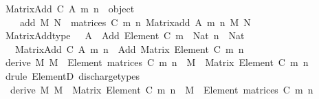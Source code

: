 \begin{isabellebody}
\ {\isachardoublequoteopen}Matrix{\isacharunderscore}{\kern0pt}Add\ C\ A\ m\ n\ {\isasymequiv}\ object\ {\isacharbraceleft}{\kern0pt}\isanewline
\ \ \ \ {\isasymlangle}{\isacharat}{\kern0pt}add{\isacharcomma}{\kern0pt}\ {\isasymlambda}M\ N\ {\isasymin}\ matrices\ C\ m\ n{\isachardot}{\kern0pt}\ Matrix{\isacharunderscore}{\kern0pt}add\ A\ m\ n\ M\ N{\isasymrangle}\isanewline
\ \ {\isacharbraceright}{\kern0pt}{\isachardoublequoteclose}\isanewline
\isanewline
{}\isamarkupfalse%
\ Matrix{\isacharunderscore}{\kern0pt}Add{\isacharunderscore}{\kern0pt}type\ {\isacharcolon}{\kern0pt}\ \ {\isachardoublequoteopen}A\ {\isacharcolon}{\kern0pt}\ Add\ {\isacharparenleft}{\kern0pt}Element\ C{\isacharparenright}{\kern0pt}{\isachardoublequoteclose}\ {\isachardoublequoteopen}m\ {\isacharcolon}{\kern0pt}\ Nat{\isachardoublequoteclose}\ {\isachardoublequoteopen}n\ {\isacharcolon}{\kern0pt}\ Nat{\isachardoublequoteclose}\isanewline
\ \ \ {\isachardoublequoteopen}Matrix{\isacharunderscore}{\kern0pt}Add\ C\ A\ m\ n\ {\isacharcolon}{\kern0pt}\ Add\ {\isacharparenleft}{\kern0pt}Matrix\ {\isacharparenleft}{\kern0pt}Element\ C{\isacharparenright}{\kern0pt}\ m\ n{\isacharparenright}{\kern0pt}{\isachardoublequoteclose}\isanewline
%
\isadelimproof
%
\endisadelimproof
%
\isatagproof
{}\isamarkupfalse%
\ {\isacharminus}{\kern0pt}\isanewline
\ \ \isamarkupfalse%
\ {\isacharbrackleft}{\kern0pt}derive{\isacharbrackright}{\kern0pt}{\isacharcolon}{\kern0pt}\ {\isachardoublequoteopen}{\isasymAnd}M{\isachardot}{\kern0pt}\ M\ {\isacharcolon}{\kern0pt}\ Element\ {\isacharparenleft}{\kern0pt}matrices\ C\ m\ n{\isacharparenright}{\kern0pt}\ {\isasymLongrightarrow}\ M\ {\isacharcolon}{\kern0pt}\ Matrix\ {\isacharparenleft}{\kern0pt}Element\ C{\isacharparenright}{\kern0pt}\ m\ n{\isachardoublequoteclose}\isanewline
\ \ \ \ \isamarkupfalse%
\ {\isacharparenleft}{\kern0pt}drule\ ElementD{\isacharparenright}{\kern0pt}\ discharge{\isacharunderscore}{\kern0pt}types\isanewline
\ \ \isamarkupfalse%
\ {}\ {\isacharbrackleft}{\kern0pt}derive{\isacharbrackright}{\kern0pt}{\isacharcolon}{\kern0pt}\ {\isachardoublequoteopen}{\isasymAnd}M{\isachardot}{\kern0pt}\ M\ {\isacharcolon}{\kern0pt}\ Matrix\ {\isacharparenleft}{\kern0pt}Element\ C{\isacharparenright}{\kern0pt}\ m\ n\ {\isasymLongrightarrow}\ M\ {\isacharcolon}{\kern0pt}\ Element\ {\isacharparenleft}{\kern0pt}matrices\ C\ m\ n{\isacharparenright}{\kern0pt}{\isachardoublequoteclose}\isanewline
\ \ \ \ \isamarkupfalse%

\end{isabellebody}
